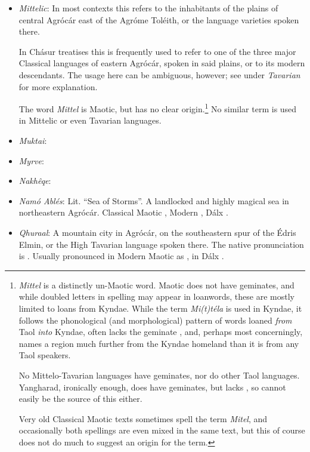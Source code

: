 \documentclass{article}
\begin{document}
\begin{itemize}
 \item \textit{Mittelic}: In most contexts this refers to the inhabitants of the plains of central Agrócár east of the Agróme Toléith, or the language varieties spoken there.

 In Chásur treatises this is frequently used to refer to one of the three major Classical languages of eastern Agrócár, spoken in said plains, or to its modern descendants. The usage here can be ambiguous, however; see under \textit{Tavarian} for more explanation.

 The word \textit{Mittel} is Maotic, but has no clear origin.\footnote{\textit{Mittel} is a distinctly un-Maotic word. Maotic does not have geminates, and while doubled letters in spelling may appear in loanwords, these are mostly limited to loans from Kyndae. While the term \textit{Mi(t)téla} is used in Kyndae, it follows the phonological (and morphological) pattern of words loaned \emph{from} Taol \emph{into} Kyndae, often lacks the geminate , and, perhaps most concerningly, names a region much further from the Kyndae homeland than it is from any Taol speakers. \par No Mittelo-Tavarian languages have geminates, nor do other Taol languages. Yangharad, ironically enough, does have geminates, but lacks , so cannot easily be the source of this either. \par Very old Classical Maotic texts sometimes spell the term \textit{Mitel}, and occasionally both spellings are even mixed in the same text, but this of course does not do much to suggest an origin for the term.} No similar term is used in Mittelic or even Tavarian languages.

 \item \textit{Muktai}:

 \item \textit{Myrve}:

 \item \textit{Nakhêqe}:

 \item \textit{Namó Ablés}: Lit. ``Sea of Storms''. A landlocked and highly magical sea in northeastern Agrócár. Classical Maotic , Modern , Dálx .

 \item \textit{Qhuraal}: A mountain city in Agrócár, on the southeastern spur of the Édris Elmin, or the High Tavarian language spoken there. The native pronunciation is . Usually pronounced in Modern Maotic as , in Dálx .


\end{itemize}
\end{document}
